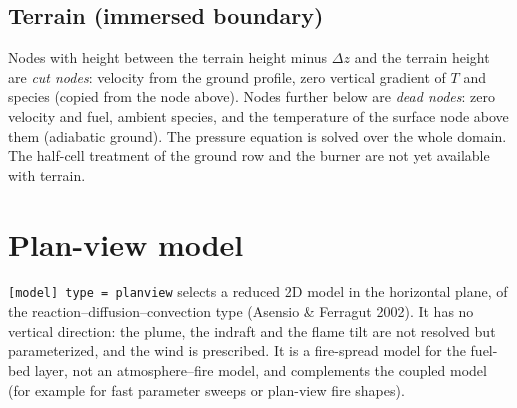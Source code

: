 \documentclass[11pt,a4paper]{article}
\newcommand{\code}[1]{\texttt{#1}}
\begin{document}
\subsection{Terrain (immersed boundary)}
Nodes with height between the terrain height minus $\Delta z$ and the terrain height are \emph{cut
nodes}: velocity from the ground profile, zero vertical gradient of $T$ and species (copied from the
node above). Nodes further below are \emph{dead nodes}: zero velocity and fuel, ambient species,
and the temperature of the surface node above them (adiabatic ground). The pressure equation is
solved over the whole domain. The half-cell treatment of the ground row and the burner are not yet
available with terrain.

\section{Plan-view model}\label{sec:planview}
\code{[model] type = planview} selects a reduced 2D model in the horizontal plane, of the
reaction--diffusion--convection type (Asensio \& Ferragut 2002). It has no vertical direction: the
plume, the indraft and the flame tilt are not resolved but parameterized, and the wind is
prescribed. It is a fire-spread model for the fuel-bed layer, not an atmosphere--fire model, and
complements the coupled model (for example for fast parameter sweeps or plan-view fire shapes).
\end{document}

